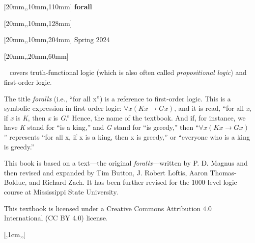 \documentclass[bleedwidth=6.35mm, marklength=0mm, coverheight=228.6mm, coverwidth=152.4mm, spinewidth=13.9mm]{bookcover}
\begin{document}
\begin{bookcover}

[20mm,,10mm,110mm]{\sffamily   %
\fontsize{44}{44}\selectfont\hfill \textbf{forall\textcolor{white}{x}}} 		%

[20mm,,10mm,128mm]{\sffamily
\fontsize{20}{20}\selectfont\hfill \textbf{\textls{\textcolor{white}{THE MISSISSIPPI STATE EDITION}}}}  


[20mm,,10mm,204mm]{\sffamily
\fontsize{16}{16}\selectfont\hfill{Spring 2024}}





[20mm,,20mm,60mm]{\sffamily    %
\textcolor{white}{}~ covers truth-functional logic (which is also often called \textit{propositional logic}) and first-order logic. 

\quad The title \textit{forallx} (i.e., ``for all x'') is a reference to first-order logic. This is a symbolic expression in first-order logic: $\forall x(Kx \rightarrow Gx)$, and it is read, ``for all \textit{x}, if \textit{x} is \textit{K}, then \textit{x} is \textit{G}.'' Hence, the name of the textbook. And if, for instance, we have \textit{K} stand for ``is a king,'' and \textit{G} stand for ``is greedy,'' then ``$\forall x(Kx \rightarrow Gx)$'' represents ``for all x, if x is a king, then x is greedy,'' or ``everyone who is a king is greedy.''

\quad This book is based on a text---the original \textit{forallx}---written by P. D. Magnus and then revised and expanded by Tim Button, J. Robert Loftis, Aaron Thomas-Bolduc, and Richard Zach. It has been further revised for the 1000-level logic course at Mississippi State University.

\quad This textbook is licensed under a Creative Commons Attribution 4.0 International (CC BY 4.0) license.  
}


[,1cm,,]{
\vfill
\centering\textcolor{forallx-orange}{
\colorbox{white}{%
}}}


\end{bookcover}
\end{document}
